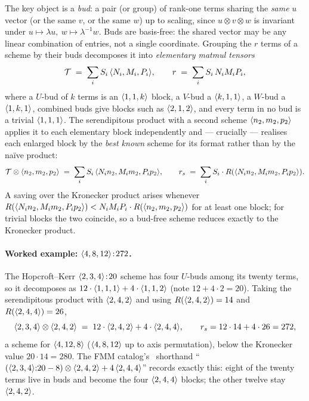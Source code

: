 The key object is a \emph{bud}: a pair (or group) of rank-one terms sharing the
\emph{same} \(u\) vector (or the same \(v\), or the same \(w\)) up to scaling, since
\(u \otimes v \otimes w\) is invariant under
\(u \mapsto \lambda u,\ w \mapsto \lambda^{-1} w\). Buds are basis-free: the shared vector
may be any linear combination of entries, not a single coordinate. Grouping the \(r\)
terms of a scheme by their buds decomposes it into \emph{elementary matmul tensors}
\[
  \mathcal{T} \;=\; \sum_{i} S_i \, \langle N_i, M_i, P_i \rangle, \qquad
  r \;=\; \sum_{i} S_i \, N_i M_i P_i ,
\]
where a \(U\)-bud of \(k\) terms is an \(\langle 1, 1, k \rangle\) block, a \(V\)-bud a
\(\langle k, 1, 1 \rangle\), a \(W\)-bud a \(\langle 1, k, 1 \rangle\), combined buds give blocks such
as \(\langle 2, 1, 2 \rangle\), and every term in no bud is a trivial \(\langle 1, 1, 1 \rangle\).
The serendipitous product with a second scheme \(\langle n_2, m_2, p_2 \rangle\) applies it to
each elementary block independently and --- crucially --- realises each enlarged block by
the \emph{best known} scheme for its format rather than by the naïve product:
\[
  \mathcal{T} \otimes \langle n_2, m_2, p_2 \rangle
  \;=\; \sum_{i} S_i \, \langle N_i n_2, M_i m_2, P_i p_2 \rangle, \qquad
  r_s \;=\; \sum_{i} S_i \cdot R(\langle N_i n_2, M_i m_2, P_i p_2 \rangle).
\]
A saving over the Kronecker product arises whenever
\(R(\langle N_i n_2, M_i m_2, P_i p_2 \rangle) < N_i M_i P_i \cdot R(\langle n_2, m_2, p_2 \rangle)\)
for at least one block; for trivial blocks the two coincide, so a bud-free scheme reduces
exactly to the Kronecker product.

\paragraph{Worked example: \(\langle 4, 8, 12 \rangle\!:\!272\).}
The Hopcroft--Kerr \(\langle 2, 3, 4 \rangle\!:\!20\) scheme has four \(U\)-buds among its twenty
terms, so it decomposes as \(12\cdot\langle 1, 1, 1 \rangle + 4\cdot\langle 1, 1, 2 \rangle\) (note
\(12 + 4\cdot 2 = 20\)). Taking the serendipitous product with \(\langle 2, 4, 2 \rangle\) and
using \(R(\langle 2, 4, 2 \rangle)=14\) and \(R(\langle 2, 4, 4 \rangle)=26\),
\[
  \langle 2, 3, 4 \rangle\otimes\langle 2, 4, 2 \rangle
  \;=\; 12\cdot\langle 2, 4, 2 \rangle + 4\cdot\langle 2, 4, 4 \rangle, \qquad
  r_s = 12\cdot 14 + 4\cdot 26 = 272,
\]
a scheme for \(\langle 4, 12, 8 \rangle\) (\(\langle 4, 8, 12 \rangle\) up to axis permutation),
below the Kronecker value \(20\cdot 14 = 280\). The FMM catalog's~\cite{fmmlille} shorthand
``\(({\langle 2, 3, 4 \rangle}{:}20 - 8)\otimes\langle 2, 4, 2 \rangle + 4\,\langle 2, 4, 4 \rangle\)''
records exactly this: eight of the twenty terms live in buds and become the four
\(\langle 2, 4, 4 \rangle\) blocks; the other twelve stay \(\langle 2, 4, 2 \rangle\).

